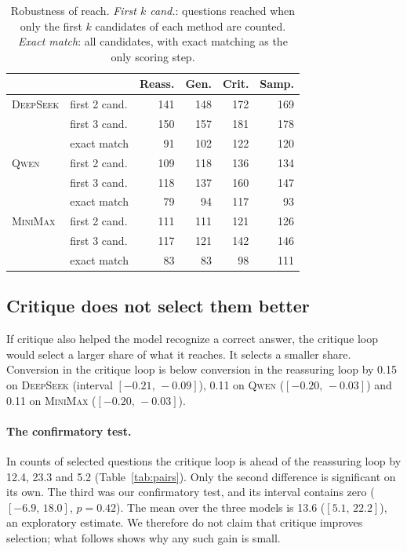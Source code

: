 \documentclass[11pt]{article}
\newcommand{\ds}{\textsc{DeepSeek}}
\newcommand{\qw}{\textsc{Qwen}}
\newcommand{\mm}{\textsc{MiniMax}}
\newcommand{\ci}[2]{$[#1,\,#2]$}
\begin{document}
\begin{table}[t]
\centering
\small
\setlength{\tabcolsep}{4pt}
\begin{tabular}{@{}ll rrrr@{}}
\toprule
 & & Reass. & Gen. & Crit. & Samp. \\
\midrule
\ds & first 2 cand. & 141 & 148 & 172 & 169 \\
 & first 3 cand. & 150 & 157 & 181 & 178 \\
 & exact match & 91 & 102 & 122 & 120 \\
\qw & first 2 cand. & 109 & 118 & 136 & 134 \\
 & first 3 cand. & 118 & 137 & 160 & 147 \\
 & exact match & 79 & 94 & 117 & 93 \\
\mm & first 2 cand. & 111 & 111 & 121 & 126 \\
 & first 3 cand. & 117 & 121 & 142 & 146 \\
 & exact match & 83 & 83 & 98 & 111 \\
\bottomrule
\end{tabular}
\caption{Robustness of reach. \emph{First $k$ cand.}: questions reached when only the first $k$ candidates of each method are counted. \emph{Exact match}: all candidates, with exact matching as the only scoring step.}
\label{tab:robust}
\end{table}

\subsection{Critique does not select them better}
\label{sec:select}

If critique also helped the model recognize a correct answer, the critique loop would select a larger share of what it reaches.
It selects a smaller share.
Conversion in the critique loop is below conversion in the reassuring loop by 0.15 on \ds{} (interval \ci{-0.21}{-0.09}), 0.11 on \qw{} (\ci{-0.20}{-0.03}) and 0.11 on \mm{} (\ci{-0.20}{-0.03}).

\paragraph{The confirmatory test.}
In counts of selected questions the critique loop is ahead of the reassuring loop by 12.4, 23.3 and 5.2 (Table~\ref{tab:pairs}).
Only the second difference is significant on its own.
The third was our confirmatory test, and its interval contains zero (\ci{-6.9}{18.0}, $p=0.42$).
The mean over the three models is 13.6 (\ci{5.1}{22.2}), an exploratory estimate.
We therefore do not claim that critique improves selection; what follows shows why any such gain is small.
\end{document}
